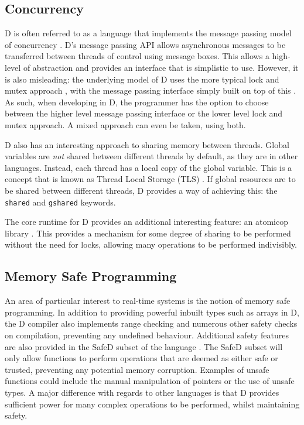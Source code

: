 \subsection{Concurrency}
D is often referred to as a language that implements the message passing model 
of concurrency \cite{ddili-book}. D's message passing API 
allows asynchronous messages to be transferred between threads of control using 
message boxes. This allows a high-level of abstraction and provides an 
interface that is simplistic to use. However, it is also misleading: the underlying 
model of D uses the more typical lock and mutex approach 
\cite{dlang-github-mutex}, 
with the message passing interface simply built on top of this 
\cite{dlang-github-concurrency}. 
As such, when developing in D, the programmer has the option to choose between 
the higher level message passing interface or the lower level lock and mutex 
approach. A mixed approach can even be taken, using both. 
\par\bigskip\noindent
D also has an interesting approach to sharing memory between threads. 
Global variables are \emph{not} shared between different threads by default, as 
they are in other languages. Instead, each thread has a local copy of the global variable. 
This is a concept that is known as Thread Local Storage (TLS) 
\cite{migrate-to-shared}. 
If global resources are to be shared between different threads, D provides a way of 
achieving this: the \texttt{shared} and
\texttt{\textunderscore{}\textunderscore{}gshared} keywords.
\par\bigskip\noindent
The core runtime for D provides an additional interesting feature: an atomicop 
library \cite{core-atomic}. 
This provides a mechanism for some degree of sharing to be performed without the 
need for locks, allowing many operations to be performed indivisibly.

\subsection{Memory Safe Programming}
An area of particular interest to real-time systems is the notion of memory 
safe programming. In addition to providing powerful inbuilt types such as arrays 
in D, the D compiler also implements range checking and numerous other 
safety checks on compilation, preventing any undefined behaviour.
Additional safety features are also provided in the SafeD subset of the language
\cite{safe-d}. The SafeD subset will only allow functions to perform 
operations that are deemed as either safe or trusted, preventing any 
potential memory corruption. Examples of unsafe functions could include the 
manual manipulation of pointers or the use of unsafe types. A major difference 
with regards to other languages is that D provides sufficient power for many complex 
operations to be performed, whilst maintaining safety.

